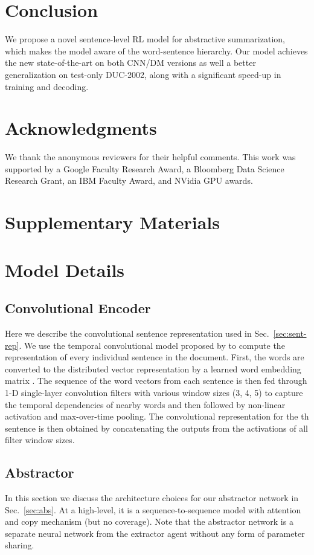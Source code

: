 \documentclass[11pt,a4paper]{article}
\def\secref#1{Sec.~\ref{#1}}
\begin{document}
 
\section{Conclusion}
We propose a novel sentence-level RL model for abstractive summarization, which makes the model aware of the word-sentence hierarchy.
Our model achieves the new state-of-the-art on both CNN/DM versions as well a better generalization on test-only DUC-2002, along with a significant speed-up in training and decoding.



\section*{Acknowledgments}
We thank the anonymous reviewers for their helpful comments. This work was supported by a
Google Faculty Research Award, a Bloomberg Data Science Research Grant, an IBM Faculty
Award, and NVidia GPU awards.




\clearpage
\appendix
\section*{Supplementary Materials}
\section{Model Details}
\subsection{Convolutional Encoder}
\label{sec:conv}
Here we describe the convolutional sentence representation used in \secref{sec:sent-rep}.
We use the temporal convolutional model proposed by 
\citet{kim:2014:EMNLP2014} to compute the representation of 
every individual sentence in the document. 
First, the words are converted to the distributed vector representation by a learned word embedding matrix . 
The sequence of the word vectors from each sentence is then fed through
1-D single-layer convolution filters with various window sizes (3, 4, 5) to capture the 
temporal dependencies of nearby words and then followed by  non-linear activation and max-over-time pooling. 
The convolutional representation  for the th sentence is then obtained by concatenating the outputs from the activations of all filter window sizes.


\subsection{Abstractor}
\label{sec:copy-summ}
In this section we discuss the architecture choices for our abstractor network in \secref{sec:abs}.
At a high-level, it is a sequence-to-sequence model with attention and copy mechanism (but no coverage).
Note that the abstractor network is a separate neural network from the extractor agent without any form of parameter sharing.
\end{document}
